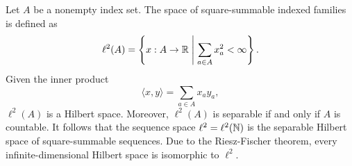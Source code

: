 Let \(A\) be a nonempty index set.
The space of square-summable indexed families is defined as
\begin{equation}
    \label{eqn:l2-space}
    \ell^2(A) = \left\{
        x : A \to \mathbb{R} \;\middle\vert\; \sum_{a \in A} x_a^2 < \infty
    \right\}.
\end{equation}
Given the inner product
\begin{equation}
    \label{eqn:l2-inner-product}
    \langle x, y \rangle = \sum_{a \in A} x_a y_a,
\end{equation}
\(\ell^2(A)\) is a Hilbert space.
Moreover, \(\ell^2(A)\) is separable if and only if \(A\) is countable.
It follows that the sequence space \(\ell^2 = \ell^2(\mathbb{N})\) is the separable Hilbert space of square-summable sequences.
Due to the Riesz-Fischer theorem, every infinite-dimensional Hilbert space is isomorphic to \(\ell^2\).